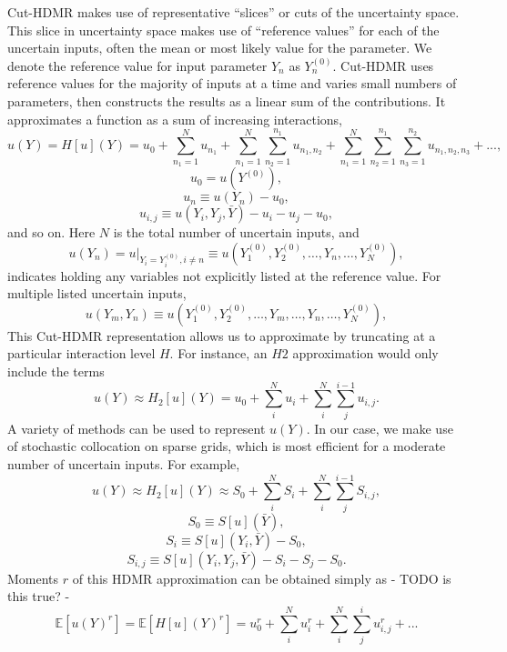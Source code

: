\documentclass[11pt]{article}
\newcommand{\expv}[1]{\ensuremath{\mathbb{E}[ #1]}}
\begin{document}
Cut-HDMR makes use of representative ``slices'' or cuts of the uncertainty space.  This slice in uncertainty space makes use of ``reference values'' for each of the uncertain inputs, often the mean or most likely value for the parameter.  We denote the reference value for input parameter $Y_n$ as $Y_n^{(0)}$.  Cut-HDMR uses reference values for the majority of inputs at a time and varies small numbers of parameters, then constructs the results as a linear sum of the contributions.
It approximates a function as a sum of increasing interactions,
\begin{equation}
u(Y)= H[u](Y)=u_0 + \sum_{n_1=1}^N u_{n_1} + \sum_{n_1=1}^N\sum_{n_2=1}^{n_1} u_{n_1,n_2} + 
                     \sum_{n_1=1}^N\sum_{n_2=1}^{n_1}\sum_{n_3=1}^{n_2}u_{n_1,n_2,n_3}+...,
\end{equation}
\begin{equation}
u_0=u(Y^{(0)}),
\end{equation}
\begin{equation}
u_{n}\equiv u(Y_n) - u_0,
\end{equation}
\begin{equation}
u_{i,j}\equiv u(Y_i,Y_j,\bar Y) - u_i - u_j - u_0,
\end{equation}
and so on.  Here $N$ is the total number of uncertain inputs, and 
\begin{equation}
u(Y_{n})=u\big|_{Y_i=Y_i^{(0)},i\neq n}\equiv u(Y_1^{(0)},Y_2^{(0)},\ldots,Y_n,\ldots,Y_N^{(0)}),
\end{equation}
indicates holding any variables not explicitly listed at the reference value.  For multiple listed uncertain inputs,
\begin{equation}
u(Y_m,Y_{n})\equiv u(Y_1^{(0)},Y_2^{(0)},\ldots,Y_m,\ldots,Y_n,\ldots,Y_N^{(0)}),
\end{equation}
This Cut-HDMR representation allows us to approximate by truncating at a particular interaction level $H$.  For instance, an $H2$ approximation would only include the terms
\begin{equation}
u(Y)\approx H_2[u](Y) = u_0 + \sum_i^N u_i + \sum_i^N\sum_j^{i-1} u_{i,j}.
\end{equation}
A variety of methods can be used to represent $u(Y)$.  In our case, we make use of stochastic collocation on sparse grids, which is most efficient for a moderate number of uncertain inputs.  For example,
\begin{equation}
u(Y)\approx H_2[u](Y)\approx S_0 + \sum_i^N S_i + \sum_i^N\sum_j^{i-1} S_{i,j},
\end{equation}
\begin{equation}
S_0\equiv S[u](\bar Y),
\end{equation}
\begin{equation}
S_i\equiv S[u](Y_i,\bar Y) - S_0,
\end{equation}
\begin{equation}
S_{i,j}\equiv S[u](Y_i,Y_j,\bar Y) - S_i - S_j - S_0.
\end{equation}
Moments $r$ of this HDMR approximation can be obtained simply as - TODO is this true? - 
\begin{equation}
\expv{u(Y)^r}=\expv{H[u](Y)^r}=u_0^r + \sum_i^N u_i^r + \sum_i^N\sum_j^i u_{i,j}^r+...
\end{equation}
\end{document}
